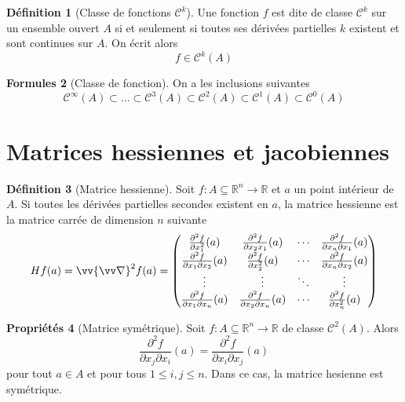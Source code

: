 \documentclass[11pt,a4paper]{article}
\theoremstyle{definition}
\newtheorem{mydef}{Définition}[section]
\newtheorem{myprop}[mydef]{Propriétés}
\newtheorem{myform}[mydef]{Formules}
\newcommand{\R}{\mathbb{R}}
\let\oldnabla\nabla
\renewcommand{\nabla}{\vv{\oldnabla}}
\newcommand{\fl}{\rightarrow}
\newcommand{\pa}{\partial}
\begin{document}
\begin{mydef}[Classe de fonctions $\mathcal{C}^k$]
Une fonction $f$ est dite de classe $\mathcal{C}^k$ sur un ensemble ouvert $A$ si et seulement si toutes ses dérivées partielles $k$\ieme{} existent et sont continues sur $A$. On écrit alors
\[ f \in \mathcal{C}^k(A) \]
\end{mydef}

\begin{myform}[Classe de fonction] On a les inclusions suivantes
 \[ \mathcal{C}^{\infty}(A) \subset \dots \subset \mathcal{C}^3(A) \subset \mathcal{C}^2(A) \subset \mathcal{C}^1(A) \subset \mathcal{C}^0(A) \]
\end{myform}


\section{Matrices hessiennes et jacobiennes}

\begin{mydef}[Matrice hessienne]
Soit $f : A \subseteq \R^n \fl \R$ et $a$ un point intérieur de $A$. Si toutes les dérivées partielles secondes existent en $a$, la matrice hessienne est la matrice carrée de dimension $n$ suivante
\[ Hf(a) = \nabla^2 f(a) = \begin{pmatrix}
\frac{\pa^2 f}{\pa x_1^2}(a) & \frac{\pa^2 f}{\pa x_2 x_1}(a) & \cdots & \frac{\pa^2 f}{\pa x_n \pa x_1}(a) \\
\frac{\pa^2 f}{\pa x_1 \pa x_2}(a) & \frac{\pa^2 f}{\pa x_2^2}(a) & \cdots & \frac{\pa^2 f}{\pa x_n \pa x_2}(a) \\
\vdots & \vdots & \ddots & \vdots \\
\frac{\pa^2 f}{\pa x_1 \pa x_n}(a) & \frac{\pa^2 f}{\pa x_2 \pa x_n}(a) & \cdots & \frac{\pa^2 f}{\pa x_n^2}(a) \\
\end{pmatrix} \]
\end{mydef}

\begin{myprop}[Matrice symétrique]
Soit $f : A \subseteq \R^n \fl \R$ de classe $\mathcal{C}^2(A)$. Alors
\[ \frac{\pa^2 f}{\pa x_j \pa x_i}(a) = \frac{\pa^2 f}{\pa x_i \pa x_j}(a) \]
pour tout $a \in A$ et pour tous $1 \leq i,j \leq n$. Dans ce cas, la matrice hesienne est symétrique.
\end{myprop}
\end{document}
